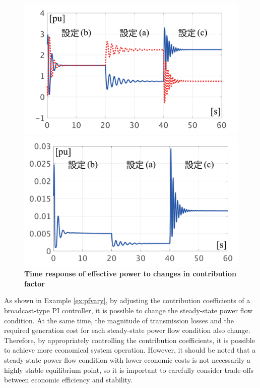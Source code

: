 \documentclass[graybox, envcountchap]{svmult}
\begin{document}
\begin{figure}[t]
  \centering
  {
  \begin{minipage}{0.49\linewidth}
    \centering
    \includegraphics[width = 1.0\linewidth]{figs/varyalphaP}
  \end{minipage}
  \begin{minipage}{0.49\linewidth}
    \centering
    \includegraphics[width = 1.0\linewidth]{figs/varyalphaloss}
  \end{minipage}
  \medskip
  \caption{\textbf{Time response of effective power to changes in contribution factor} }
  \label{fig:agcPvary}
  }
\medskip
\end{figure}

As shown in Example \ref{ex:pfvary}, by adjusting the contribution coefficients
of a broadcast-type PI controller, it is possible to change the steady-state
power flow condition. At the same time, the magnitude of transmission losses and
the required generation cost for each steady-state power flow condition also
change. Therefore, by appropriately controlling the contribution coefficients,
it is possible to achieve more economical system operation. However, it should
be noted that a steady-state power flow condition with lower economic costs is
not necessarily a highly stable equilibrium point, so it is important to
carefully consider trade-offs between economic efficiency and stability. 
\end{document}
